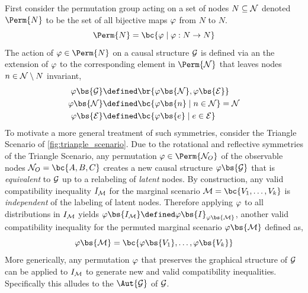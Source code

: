 \documentclass[aps, 10pt, english, twoside, pra, nofootinbib, longbibliography]{revtex4-1}
\begin{document}
    First consider the permutation group acting on a set of nodes $N \subseteq \mathcal{N}$ denoted $\Perm{N}$ to be the set of all bijective maps $\varphi$ from $N$ to $N$.
    \[ \Perm{N} = \bc{\gep \mid \gep : N \to N} \]
    The action of $\gep \in \Perm{N}$ on a causal structure $\mathcal{G}$ is defined via an the extension of $\varphi$ to the corresponding element in $\Perm{\nodes}$ that leaves nodes $n \in \mathcal{N} \setminus N$ invariant,
    \begin{align*}
    \gep\bs{\graph} &\defined \br{\gep\bs{\nodes}, \gep\bs{\edges}} \\
    \gep\bs{\nodes} &\defined \bc{\gep\bs{n} \mid n \in \nodes} = \nodes \\
    \gep\bs{\edges} &\defined \bc{\gep\bs{e} \mid e \in \edges}
    \end{align*}
    To motivate a more general treatment of such symmetries, consider the Triangle Scenario of \cref{fig:triangle_scenario}. Due to the rotational and reflective symmetries of the Triangle Scenario, any permutation $\gep \in \Perm{\nodes_O}$ of the observable nodes $\nodes_O = \bc{A, B, C}$ creates a new causal structure $\gep\bs{\graph}$ that is \textit{equivalent} to $\mathcal{G}$ up to a relabeling of \textit{latent} nodes. By construction, any valid compatibility inequality $I_{\mathcal{M}}$ for the marginal scenario $\mscenario = \bc{V_1, \ldots, V_k}$ is \textit{independent} of the labeling of latent nodes. Therefore applying $\varphi$ to all distributions in $I_{\mathcal{M}}$ yields $\gep\bs{I_{\mscenario}} \defined \gep\bs{I}_{\gep\bs{\mscenario}}$, another valid compatibility inequality for the permuted marginal scenario $\gep\bs{\mscenario}$ defined as,
    \[ \gep\bs{\mscenario} = \bc{\gep\bs{V_1}, \ldots, \gep\bs{V_k}} \]
    More generically, any permutation $\varphi$ that preserves the graphical structure of $\mathcal{G}$ can be applied to $I_{\mathcal{M}}$ to generate new and valid compatibility inequalities. Specifically this alludes to the  $\Aut{\graph}$ of $\mathcal{G}$.
\end{document}
